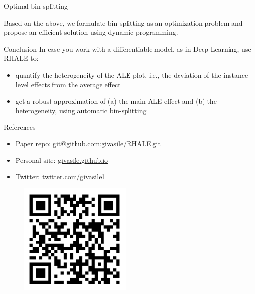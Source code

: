 \documentclass[final]{beamer}
\newlength{\colwidth}
\begin{document}
\begin{frame}[t]
\begin{columns}[t]
\begin{column}{\colwidth}
\begin{defbox}{Optimal bin-splitting}{}
        \vspace{10mm}

        Based on the above, we formulate bin-splitting as an optimization problem and propose an efficient solution using dynamic programming.

  \end{defbox}

  
      \begin{alertblock}{Conclusion} In case you work with a differentiable model, as in Deep Learning, use RHALE to:
        \begin{itemize}
        \item quantify the heterogeneity of the ALE plot, i.e., the deviation of the instance-level effects from the average effect
        \item get a robust approximation of (a) the main ALE effect and (b) the heterogeneity, using automatic bin-splitting
      \end{itemize}
    \end{alertblock}

    \begin{block}{References}
      \printbibliography[heading=none]
      \begin{itemize}
      \item \large Paper repo: \href{git@github.com:givasile/RHALE.git}{git@github.com:givasile/RHALE.git}
      \item \large Personal site: \href{givasile.github.io}{givasile.github.io}
      \item \large Twitter: \href{https://twitter.com/givasile1}{twitter.com/givasile1}
      
      \end{itemize}

	\end{block}
      \begin{figure}
        \centering
        \includegraphics[width=0.49\textwidth]{./Publications.png}
      \end{figure}


\end{column}
\end{columns}
\end{frame}
\end{document}
